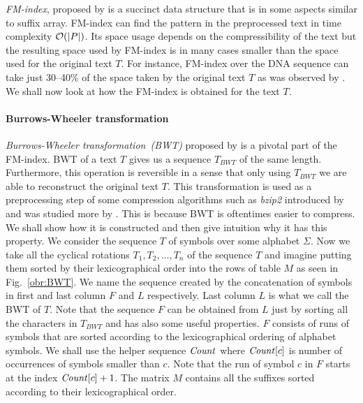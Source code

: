 \textit{FM-index}, proposed by \cite{ferragina2000opportunistic} is a succinct data structure that
is in some aspects similar to suffix array. FM-index can find the pattern in the preprocessed text
in time complexity $\mathcal{O}(|P|)$. Its space usage depends on the compressibility of the text but the
resulting space used by FM-index is in many cases smaller than the space used for the original text $T$.
For instance, FM-index over the DNA sequence can take just 30--40\% of the space taken by the original text
$T$ as was observed by \cite{ferragina2001experimental}. We shall now look at how the FM-index
is obtained for the text $T$.

\paragraph{Burrows-Wheeler transformation}

\textit{Burrows-Wheeler transformation~(BWT)} proposed by \cite{burrows1994block} is a pivotal
part of the FM-index. BWT of a text $T$ gives us a sequence $\mathit{T_{BWT}}$ of the same
length. Furthermore, this operation is reversible in a sense that only using $\mathit{T_{BWT}}$
we are able to reconstruct the original text $T$. This transformation is used as a
preprocessing step of some compression algorithms such as \textit{bzip2} introduced by
\cite{seward1996bzip2} and was studied more by \cite{manzini2001analysis}. This is because
BWT is oftentimes easier to compress. We shall show how it is constructed and then give 
intuition why it has this property. We consider the sequence $T$ of symbols over some
alphabet $\Sigma$. Now we take all the cyclical rotations $T_1, T_2, \ldots ,T_n$ of
the sequence $T$ and imagine putting them sorted by their lexicographical order into the
rows of table $M$ as seen in Fig.~\ref{obr:BWT}. We name the sequence created by the
concatenation of symbols in first and last column $F$ and $L$ respectively. Last column $L$
is what we call the BWT of $T$. Note that the sequence $F$ can be obtained from $L$ just by
sorting all the characters in $\mathit{T_{BWT}}$ and has also some useful properties. $F$ consists
of runs of symbols that are sorted according to the lexicographical ordering of alphabet symbols.
We shall use the helper sequence $\mathit{Count}$ where $\mathit{Count}[c]$ is number of occurrences of symbols
smaller than $c$. Note that the run of symbol $c$ in $F$ starts at the index $\mathit{Count}[c]+1$. The
matrix $M$ contains all the suffixes sorted according to their lexicographical order.

